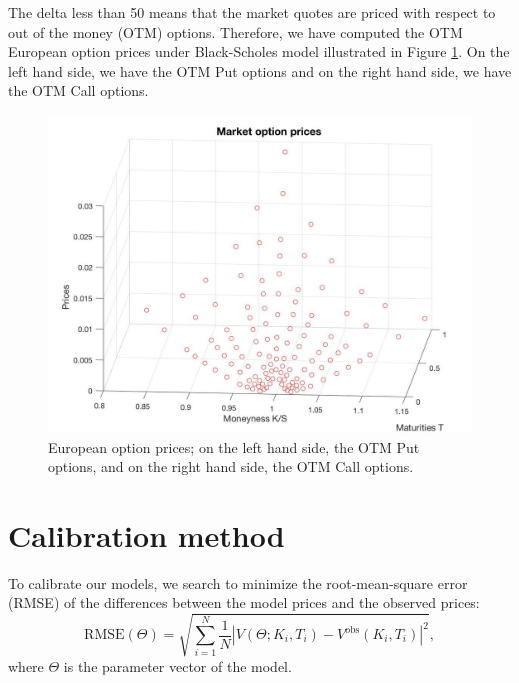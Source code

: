 The delta less than 50 means that the market quotes are priced with respect to out of the money (OTM) options. Therefore, we have computed the OTM European option prices under Black-Scholes model illustrated in Figure \ref{fig:calibration:prices}. On the left hand side, we have the OTM Put options and on the right hand side, we have the OTM Call options.
\begin{figure}[!htb]
\centering
	\includegraphics[scale = 0.3]{gfx/Euro-prices}
	\caption{European option prices; on the left hand side, the OTM Put options, and on the right hand side, the OTM Call options.}
	\label{fig:calibration:prices}
\end{figure}

\section{Calibration method}
\label{sec:calibration:method}
To calibrate our models, we search to minimize the root-mean-square error (RMSE) of the differences between the model prices and the observed prices:
$$\text{RMSE}(\Theta) = \sqrt{\sum_{i=1}^N \frac{1}{N}\left|V(\Theta;K_i,T_i)-V^\text{obs}(K_i,T_i)\right|^2},$$
where $\Theta$ is the parameter vector of the model.

